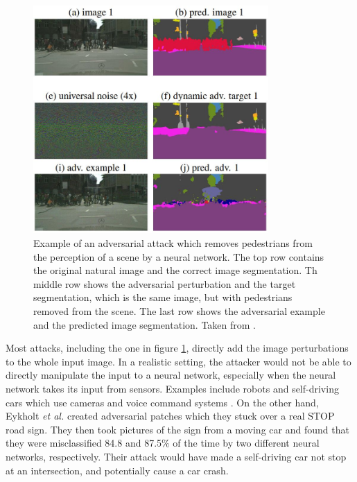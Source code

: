 \begin{figure}[ht]
    \centering
    \includegraphics[width=0.8\textwidth]{graphics/adversarial_segmentation.JPG}
    \caption{Example of an adversarial attack which removes pedestrians from the perception of a scene by a neural network. The top row contains the original natural image and the correct image segmentation. Th middle row shows the adversarial perturbation and the target segmentation, which is the same image, but with pedestrians removed from the scene. The last row shows the adversarial example and the predicted image segmentation. Taken from \cite{Metzen_2017_ICCV}.}
    \label{fig:adversarial_segmentation}
\end{figure}

Most attacks, including the one in figure \ref{fig:adversarial_segmentation}, directly add the image perturbations to the whole input image. In a realistic setting, the attacker would not be able to directly manipulate the input to a neural network, especially when the neural network takes its input from sensors. Examples include robots and self-driving cars which use cameras and voice command systems \cite{kurakin2016adversarial}. On the other hand, Eykholt \textit{et al.} \cite{evtimov_road_signs} created adversarial patches which they stuck over a real STOP road sign. They then took pictures of the sign from a moving car and found that they were misclassified 84.8 and 87.5\% of the time by two different neural networks, respectively. Their attack would have made a self-driving car not stop at an intersection, and potentially cause a car crash.

